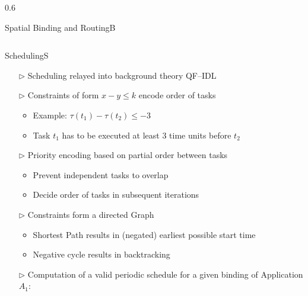 \documentclass[final]{beamer} %
\newlength\colwidth
\renewcommand{\blacktriangleright}{\triangleright}
\begin{document}
\begin{frame}{}
\begin{columns}[T]
\begin{column}{0.6\colwidth}
\begin{myblock}{Spatial Binding and Routing}{B}
\begin{itemize}
\begin{center}
	  						
	  					\end{center}
	  				\end{itemize}
	  			\end{myblock}
	  		\end{column}
	  	\end{columns}
  	\vspace*{1.0cm}
		\begin{columns}[T]
  			\begin{column}{\colwidth}
  				\begin{myblock}{Scheduling}{S}
  					\begin{itemize}
  						\item[\color{HRO1}$\blacktriangleright$] Scheduling relayed into background theory QF--IDL
  						\item[\color{HRO1}$\blacktriangleright$] Constraints of form $x-y\leq k$ encode order of tasks
  						\begin{itemize}
  							\item Example: $\tau(t_1)-\tau(t_2)\leq -3$
  							\item Task $t_1$ has to be executed at least $3$ time units before $t_2$
  						\end{itemize}
  						\item[\color{HRO1}$\blacktriangleright$] Priority encoding based on partial order between tasks
  						\begin{itemize}
  							\item Prevent independent tasks to overlap
  							\item Decide order of tasks in subsequent iterations
  						\end{itemize}
  						\item[\color{HRO1}$\blacktriangleright$] Constraints form a directed Graph
  						\begin{itemize}
  							\item Shortest Path results in (negated) earliest possible start time
  							\item Negative cycle results in backtracking
  						\end{itemize}
  						\item[\color{HRO1}$\blacktriangleright$] Computation of a valid periodic schedule for a given binding of Application $A_1$:
  					\end{itemize}
  					\vspace*{-1.24cm}
  					\begin{center}
  						

\end{center}
\end{myblock}
\end{column}
\end{columns}
\end{frame}
\end{document}
